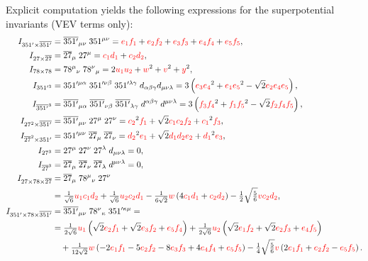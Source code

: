 \documentclass[a4paper,12pt]{article}
\def\RED{\textcolor{red}}
\begin{document}
Explicit computation yields the following expressions for the superpotential invariants (VEV terms only):
        \begin{align}
        I_{351'\times\overline{351'}}&=\overline{351'}_{\mu\nu}\;351^{\mu\nu}=\RED{e_1} \RED{f_1}+\RED{e_2} \RED{f_2}+\RED{e_3} \RED{f_3}+\RED{e_4} \RED{f_4}+\RED{e_5} \RED{f_5},\label{equation:computed-invariant-first}\\
        I_{27\times\overline{27}}&=\overline{27}_\mu\; 27^\mu=\RED{c_1} \RED{d_1}+\RED{c_2} \RED{d_2},\\
        I_{78\times 78}&=78^{\mu}{}_{\nu}\;78^{\nu}{}_{\mu}=2 \RED{u_1} \RED{u_2} + \RED{w}^2+\RED{v}^2+\RED{y}^2,\\
        I_{351'^3}&=351'^{\mu\alpha}\;351'^{\nu\beta}\;351'^{\lambda\gamma}\;d_{\alpha\beta\gamma}d_{\mu\nu\lambda}=3 \left(\RED{e_3} \RED{e_4}^2+\RED{e_1} \RED{e_5}^2 - \sqrt{2} \RED{e_2} \RED{e_4} \RED{e_5} \right),\\
        I_{\overline{351'}^3}&=\overline{351'}_{\mu\alpha}\;\overline{351'}_{\nu\beta}\;\overline{351'}_{\lambda\gamma}\;d^{\alpha\beta\gamma}\;d^{\mu\nu\lambda}=3 \left(\RED{f_3} \RED{f_4}^2+\RED{f_1} \RED{f_5}^2 - \sqrt{2}\RED{f_2} \RED{f_4} \RED{f_5}\right),\\
        I_{27^2\times\overline{351'}}&=\overline{351'}_{\mu\nu}\;27^\mu\;27^\nu=\RED{c_2}^2 \RED{f_1} + \sqrt{2} \RED{c_1} \RED{c_2} \RED{f_2} + \RED{c_1}^2 \RED{f_3},\\
        I_{\overline{27}^2\times 351'}&=351'^{\mu\nu}\;\overline{27}_\mu\;\overline{27}_\nu=\RED{d_2}^2 \RED{e_1} + \sqrt{2} \RED{d_1} \RED{d_2} \RED{e_2} + \RED{d_1}^2 \RED{e_3},\\
        I_{27^3}&=27^\mu\;27^\nu\;27^\lambda\;d_{\mu\nu\lambda}=0,\\
        I_{\overline{27}^3}&=\overline{27}_\mu\;\overline{27}_\nu\;\overline{27}_\lambda\;d^{\mu\nu\lambda}=0,\\
        I_{27\times 78\times \overline{27}}&=\overline{27}_{\mu}\;78^{\mu}{}_{\nu}\;27^\nu\nonumber\\
        &=
        \tfrac{1}{\sqrt{6}}\RED{u_1}\RED{c_1}\RED{d_2} + \tfrac{1}{\sqrt{6}}\RED{u_2} \RED{c_2} \RED{d_1}-\tfrac{1}{6\sqrt{2}}\RED{w}\left(4 \RED{c_1}\RED{d_1}+\RED{c_2}\RED{d_2}\right)-\tfrac{1}{2} \sqrt{\tfrac{5}{6}} \RED{v} \RED{c_2}\RED{d_2},\\
        I_{351'\times 78\times \overline{351'}}&=\overline{351'}_{\mu\nu}\;78^{\nu}{}_{\kappa}\;351'^{\kappa\mu}=\nonumber\\
        &=\tfrac{1}{2\sqrt{6}}\RED{u_1}\left(\sqrt{2} \RED{e_2} \RED{f_1}+\sqrt{2} \RED{e_3} \RED{f_2}+\RED{e_5} \RED{f_4}\right)+
        \tfrac{1}{2\sqrt{6}}\RED{u_2}\left(\sqrt{2} \RED{e_1} \RED{f_2}+\sqrt{2} \RED{e_2} \RED{f_3}+\RED{e_4} \RED{f_5}\right)\nonumber\\
        &\quad +
        \tfrac{1}{12\sqrt{2}}\RED{w}\left(-2 \RED{e_1} \RED{f_1}-5 \RED{e_2} \RED{f_2}-8 \RED{e_3} \RED{f_3}+4 \RED{e_4} \RED{f_4}+\RED{e_5} \RED{f_5}\right)
        -\tfrac{1}{4} \sqrt{\tfrac{5}{6}} \RED{v}\left(2 \RED{e_1} \RED{f_1}+\RED{e_2} \RED{f_2}-\RED{e_5} \RED{f_5}\right).\label{equation:computed-invariant-last}
        \end{align}
\end{document}
